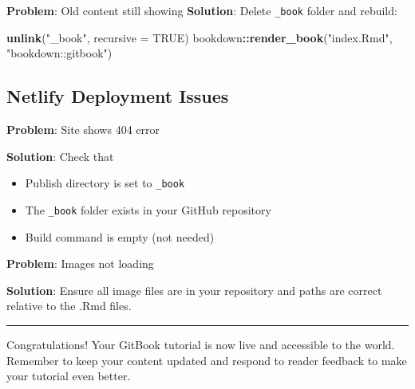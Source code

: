 \documentclass[
]{book}
\newenvironment{Shaded}{\begin{snugshade}}{\end{snugshade}}
\newcommand{\AttributeTok}[1]{\textcolor[rgb]{0.13,0.29,0.53}{#1}}
\newcommand{\ConstantTok}[1]{\textcolor[rgb]{0.56,0.35,0.01}{#1}}
\newcommand{\FunctionTok}[1]{\textcolor[rgb]{0.13,0.29,0.53}{\textbf{#1}}}
\newcommand{\NormalTok}[1]{#1}
\newcommand{\SpecialCharTok}[1]{\textcolor[rgb]{0.81,0.36,0.00}{\textbf{#1}}}
\newcommand{\StringTok}[1]{\textcolor[rgb]{0.31,0.60,0.02}{#1}}
\providecommand{\tightlist}{%
  \setlength{\itemsep}{0pt}\setlength{\parskip}{0pt}}
\begin{document}
\textbf{Problem}: Old content still showing
\textbf{Solution}: Delete \texttt{\_book} folder and rebuild:

\begin{Shaded}
\begin{Highlighting}[]
\FunctionTok{unlink}\NormalTok{(}\StringTok{"\_book"}\NormalTok{, }\AttributeTok{recursive =} \ConstantTok{TRUE}\NormalTok{)}
\NormalTok{bookdown}\SpecialCharTok{::}\FunctionTok{render\_book}\NormalTok{(}\StringTok{"index.Rmd"}\NormalTok{, }\StringTok{"bookdown::gitbook"}\NormalTok{)}
\end{Highlighting}
\end{Shaded}

\subsection{Netlify Deployment Issues}\label{netlify-deployment-issues}

\textbf{Problem}: Site shows 404 error

\textbf{Solution}: Check that

\begin{itemize}
\tightlist
\item
  Publish directory is set to \texttt{\_book}
\item
  The \texttt{\_book} folder exists in your GitHub repository
\item
  Build command is empty (not needed)
\end{itemize}

\textbf{Problem}: Images not loading

\textbf{Solution}: Ensure all image files are in your repository and paths are correct relative to the .Rmd files.

\begin{center}\rule{0.5\linewidth}{0.5pt}\end{center}

Congratulations! Your GitBook tutorial is now live and accessible to the world. Remember to keep your content updated and respond to reader feedback to make your tutorial even better.


\end{document}
